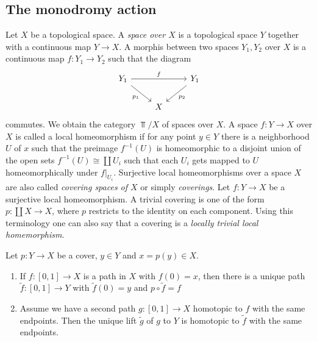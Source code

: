 \subsection{The monodromy action}

\begin{construction}
	Let $X$ be a topological space. A \textit{space over $X$ } is a topological space $Y$ together with a continuous map $Y \to X$. A morphis between two spaces $Y_1, Y_2$ over $X$ is a continuous map $f: Y_1 \to Y_2$ such that the diagram
	\[
		\begin{tikzcd}
			{Y_1} && {Y_1} \\
			& X
			\arrow["f", from=1-1, to=1-3]
			\arrow["{p_2}", from=1-3, to=2-2]
			\arrow["{p_1}"', from=1-1, to=2-2]
		\end{tikzcd}
	\]
	commutes. We obtain the category $\Top/X$ of spaces over $X$. A space $f: Y \to X$ over $X$ is called a local homeomorphism if for any point $y \in Y$ there is a neighborhood $U$ of $x$ such that the preimage $f^{-1}(U)$ is homeomorphic to a disjoint union of the open sets $f^{-1}(U) \cong \coprod U_i$ such that each $U_i$ gets mapped to $U$ homeomorphically under $f|_{U_i}$. Surjective local homeomorphisms over a space $X$ are also called \textit{covering spaces of $X$} or simply \textit{coverings}. Let $f: Y \to X$ be a surjective local homeomorphism. A trivial covering is one of the form $p: \coprod X \to X$, where $p$ restricts to the identity on each component. Using this terminology one can also say that a covering is a \textit{locally trivial local homemorphism}.
\end{construction}

\begin{lemma}
	Let $p: Y \to X$ be a cover, $y \in Y$ and $x = p(y) \in X$.
	\begin{enumerate}
		\item If $f: [0,1] \to X$ is a path in $X$ with $f(0) = x$, then there is a unique path $\tilde{f}: [0,1] \to Y$ with $\tilde{f}(0) = y$ and $p \circ \tilde{f} = f$
		\item Assume we have a second path $g \colon [0,1] \to X$ homotopic to $f$ with the same endpoints. Then the unique lift $\tilde{g}$ of $g$ to $Y$ is homotopic to $\tilde{f}$ with the same endpoints.
	\end{enumerate}
\end{lemma}


